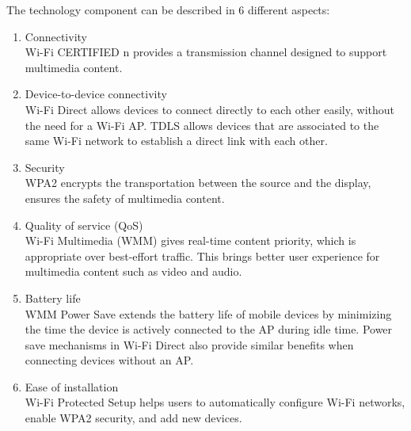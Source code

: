The technology component can be described in 6 different aspects: \\
\begin{enumerate} 
\item Connectivity\\ 
Wi-Fi CERTIFIED n provides a transmission channel designed to support 
multimedia content. 
\item Device-to-device connectivity\\ 
Wi-Fi Direct allows devices to connect directly to each other easily, without the need for a Wi-Fi AP. TDLS allows devices that are associated to the same Wi-Fi network to establish a direct 
link with each other. 
\item Security\\ 
WPA2 encrypts the transportation between the source and the display, ensures the safety of multimedia content. 
\item Quality of service (QoS)\\ 
Wi-Fi Multimedia (WMM) gives real-time content priority, which is appropriate over best-effort traffic. This brings better user experience for multimedia content such as video and audio.
\item Battery life \\ 
WMM Power Save extends the battery life of mobile devices by minimizing the time the device is actively connected to the AP during idle time. Power save mechanisms in Wi-Fi Direct also provide similar benefits when connecting devices without an AP. 
\item Ease of installation\\ 
Wi-Fi Protected Setup helps users to automatically configure Wi-Fi networks, enable WPA2 security, and add new devices. 
\end{enumerate}

